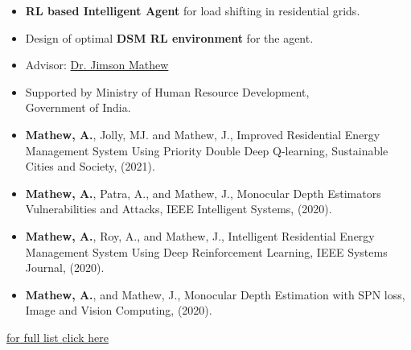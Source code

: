 \documentclass[10pt,a4paper,ragged2e, normalphoto]{altacv}
\begin{document}
\divider


\begin{itemize}
	\item \textbf{RL based Intelligent Agent} for load shifting in residential grids.
	\item Design of optimal \textbf{DSM RL environment} for the agent.
	\item Advisor: \href{https://dblp.org/pid/93/1946.html}{{\color{IFLightBlue}Dr. Jimson Mathew}}
	\item Supported by Ministry of Human Resource Development,\\ Government of India.
\end{itemize}



\begin{itemize}
	\item {\color{IFLightBlue} \textbf{Mathew, A.}}, Jolly, MJ. and Mathew, J., Improved Residential Energy Management System Using Priority Double Deep Q-learning, Sustainable Cities and Society, (2021).
	\item {\color{IFLightBlue} \textbf{Mathew, A.}}, Patra, A., and Mathew, J., Monocular Depth Estimators Vulnerabilities and Attacks, IEEE Intelligent Systems, (2020).
	\item {\color{IFLightBlue} \textbf{Mathew, A.}}, Roy, A., and Mathew, J., Intelligent Residential Energy Management System Using Deep Reinforcement Learning, IEEE Systems Journal, (2020).
	\item {\color{IFLightBlue} \textbf{Mathew, A.}}, and Mathew, J., Monocular Depth Estimation with SPN loss, Image and Vision Computing, (2020).
\end{itemize}

\hfill \href{https://alwynm.github.io/pub}{for full list {\color{IFLightBlue}click here}}
\end{document}
